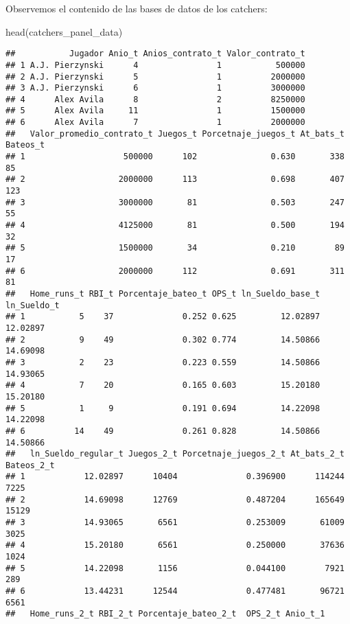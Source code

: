 \documentclass[
]{article}
\newenvironment{Shaded}{\begin{snugshade}}{\end{snugshade}}
\newcommand{\FunctionTok}[1]{\textcolor[rgb]{0.00,0.00,0.00}{#1}}
\newcommand{\NormalTok}[1]{#1}
\begin{document}
Observemos el contenido de las bases de datos de los catchers:

\begin{Shaded}
\begin{Highlighting}[]
\FunctionTok{head}\NormalTok{(catchers\_panel\_data)}
\end{Highlighting}
\end{Shaded}

\begin{verbatim}
##           Jugador Anio_t Anios_contrato_t Valor_contrato_t
## 1 A.J. Pierzynski      4                1           500000
## 2 A.J. Pierzynski      5                1          2000000
## 3 A.J. Pierzynski      6                1          3000000
## 4      Alex Avila      8                2          8250000
## 5      Alex Avila     11                1          1500000
## 6      Alex Avila      7                1          2000000
##   Valor_promedio_contrato_t Juegos_t Porcetnaje_juegos_t At_bats_t Bateos_t
## 1                    500000      102               0.630       338       85
## 2                   2000000      113               0.698       407      123
## 3                   3000000       81               0.503       247       55
## 4                   4125000       81               0.500       194       32
## 5                   1500000       34               0.210        89       17
## 6                   2000000      112               0.691       311       81
##   Home_runs_t RBI_t Porcentaje_bateo_t OPS_t ln_Sueldo_base_t ln_Sueldo_t
## 1           5    37              0.252 0.625         12.02897    12.02897
## 2           9    49              0.302 0.774         14.50866    14.69098
## 3           2    23              0.223 0.559         14.50866    14.93065
## 4           7    20              0.165 0.603         15.20180    15.20180
## 5           1     9              0.191 0.694         14.22098    14.22098
## 6          14    49              0.261 0.828         14.50866    14.50866
##   ln_Sueldo_regular_t Juegos_2_t Porcetnaje_juegos_2_t At_bats_2_t Bateos_2_t
## 1            12.02897      10404              0.396900      114244       7225
## 2            14.69098      12769              0.487204      165649      15129
## 3            14.93065       6561              0.253009       61009       3025
## 4            15.20180       6561              0.250000       37636       1024
## 5            14.22098       1156              0.044100        7921        289
## 6            13.44231      12544              0.477481       96721       6561
##   Home_runs_2_t RBI_2_t Porcentaje_bateo_2_t  OPS_2_t Anio_t_1

\end{verbatim}
\end{document}
